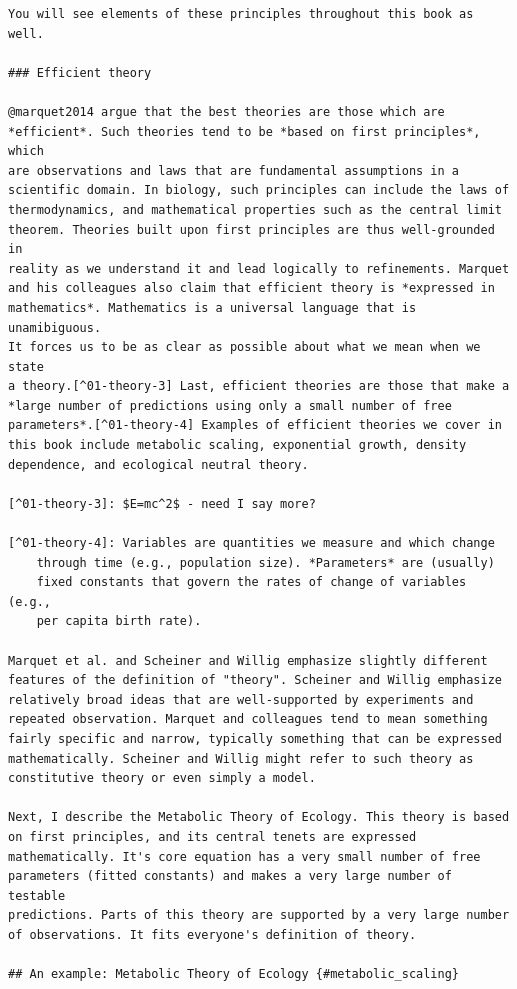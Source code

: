 \documentclass[
  10pt,
  letterpaper,
  nols]{tufte-book}
\begin{document}
\begin{verbatim}
You will see elements of these principles throughout this book as well.

### Efficient theory

@marquet2014 argue that the best theories are those which are
*efficient*. Such theories tend to be *based on first principles*, which
are observations and laws that are fundamental assumptions in a
scientific domain. In biology, such principles can include the laws of
thermodynamics, and mathematical properties such as the central limit
theorem. Theories built upon first principles are thus well-grounded in
reality as we understand it and lead logically to refinements. Marquet
and his colleagues also claim that efficient theory is *expressed in
mathematics*. Mathematics is a universal language that is unamibiguous.
It forces us to be as clear as possible about what we mean when we state
a theory.[^01-theory-3] Last, efficient theories are those that make a
*large number of predictions using only a small number of free
parameters*.[^01-theory-4] Examples of efficient theories we cover in
this book include metabolic scaling, exponential growth, density
dependence, and ecological neutral theory.

[^01-theory-3]: $E=mc^2$ - need I say more?

[^01-theory-4]: Variables are quantities we measure and which change
    through time (e.g., population size). *Parameters* are (usually)
    fixed constants that govern the rates of change of variables (e.g.,
    per capita birth rate).

Marquet et al. and Scheiner and Willig emphasize slightly different
features of the definition of "theory". Scheiner and Willig emphasize
relatively broad ideas that are well-supported by experiments and
repeated observation. Marquet and colleagues tend to mean something
fairly specific and narrow, typically something that can be expressed
mathematically. Scheiner and Willig might refer to such theory as
constitutive theory or even simply a model.

Next, I describe the Metabolic Theory of Ecology. This theory is based
on first principles, and its central tenets are expressed
mathematically. It's core equation has a very small number of free
parameters (fitted constants) and makes a very large number of testable
predictions. Parts of this theory are supported by a very large number
of observations. It fits everyone's definition of theory.

## An example: Metabolic Theory of Ecology {#metabolic_scaling}


\end{verbatim}
\end{document}
